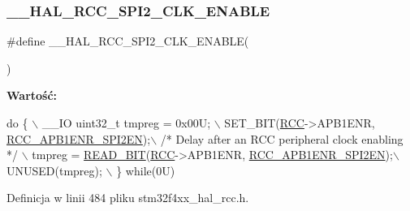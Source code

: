 \subsubsection{\texorpdfstring{\+\_\+\+\_\+\+H\+A\+L\+\_\+\+R\+C\+C\+\_\+\+S\+P\+I2\+\_\+\+C\+L\+K\+\_\+\+E\+N\+A\+B\+LE}{\_\_HAL\_RCC\_SPI2\_CLK\_ENABLE}}
{\footnotesize\ttfamily \#define \+\_\+\+\_\+\+H\+A\+L\+\_\+\+R\+C\+C\+\_\+\+S\+P\+I2\+\_\+\+C\+L\+K\+\_\+\+E\+N\+A\+B\+LE(\begin{DoxyParamCaption}{ }\end{DoxyParamCaption})}

{\bfseries Wartość\+:}
\begin{DoxyCode}
\textcolor{keywordflow}{do} \{ \(\backslash\)
                                        \_\_IO uint32\_t tmpreg = 0x00U; \(\backslash\)
                                        SET\_BIT(\hyperlink{group___peripheral__declaration_ga74944438a086975793d26ae48d5882d4}{RCC}->APB1ENR, 
      \hyperlink{group___peripheral___registers___bits___definition_gafdce64692c44bf95efbf2fed054e59be}{RCC\_APB1ENR\_SPI2EN});\(\backslash\)
                                        \textcolor{comment}{/* Delay after an RCC peripheral clock enabling */} \(\backslash\)
                                        tmpreg = \hyperlink{group___exported__macro_ga822bb1bb9710d5f2fa6396b84e583c33}{READ\_BIT}(\hyperlink{group___peripheral__declaration_ga74944438a086975793d26ae48d5882d4}{RCC}->APB1ENR, 
      \hyperlink{group___peripheral___registers___bits___definition_gafdce64692c44bf95efbf2fed054e59be}{RCC\_APB1ENR\_SPI2EN});\(\backslash\)
                                        UNUSED(tmpreg); \(\backslash\)
                                          \} \textcolor{keywordflow}{while}(0U)
\end{DoxyCode}


Definicja w linii 484 pliku stm32f4xx\+\_\+hal\+\_\+rcc.\+h.

\mbox{\label{group___r_c_c___a_p_b1___clock___enable___disable_ga44f246a1407fadc350e416e4c3256f6e}} 
